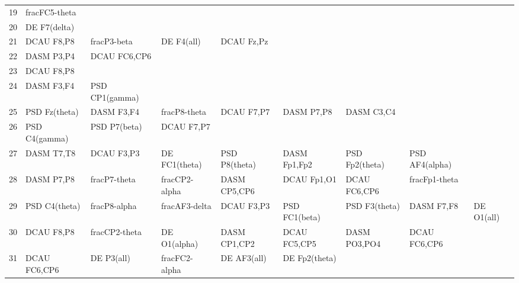 \begin{landscape}
\begin{table}[]
\begin{tabular}{l|llllllll}
19                 & fracFC5-theta        &                         &                      &                    &                       &                      &                 &                 \\
20                 & DE F7(delta)         &                         &                      &                    &                       &                      &                 &                 \\
21                 & DCAU F8,P8           & fracP3-beta             & DE F4(all)           & DCAU Fz,Pz         &                       &                      &                 &                 \\
22                 & DASM P3,P4           & DCAU FC6,CP6            &                      &                    &                       &                      &                 &                 \\
23                 & DCAU F8,P8           &                         &                      &                    &                       &                      &                 &                 \\
24                 & DASM F3,F4           & PSD CP1(gamma)          &                      &                    &                       &                      &                 &                 \\
25                 & PSD Fz(theta)        & DASM F3,F4              & fracP8-theta         & DCAU F7,P7         & DASM P7,P8            & DASM C3,C4           &                 &                 \\
26                 & PSD C4(gamma)        & PSD P7(beta)            & DCAU F7,P7           &                    &                       &                      &                 &                 \\
27                 & DASM T7,T8           & DCAU F3,P3              & DE FC1(theta)        & PSD P8(theta)      & DASM Fp1,Fp2          & PSD Fp2(theta)       & PSD AF4(alpha)  &                 \\
28                 & DASM P7,P8           & fracP7-theta            & fracCP2-alpha        & DASM CP5,CP6       & DCAU Fp1,O1           & DCAU FC6,CP6         & fracFp1-theta   &                 \\
29                 & PSD C4(theta)        & fracP8-alpha            & fracAF3-delta        & DCAU F3,P3         & PSD FC1(beta)         & PSD F3(theta)        & DASM F7,F8      & DE O1(all)      \\
30                 & DCAU F8,P8           & fracCP2-theta           & DE O1(alpha)         & DASM CP1,CP2       & DCAU FC5,CP5          & DASM PO3,PO4         & DCAU FC6,CP6    &                 \\
31                 & DCAU FC6,CP6         & DE P3(all)              & fracFC2-alpha        & DE AF3(all)        & DE Fp2(theta)         &                      &                 &                 \\
\end{tabular}
\end{table}
\end{landscape}
